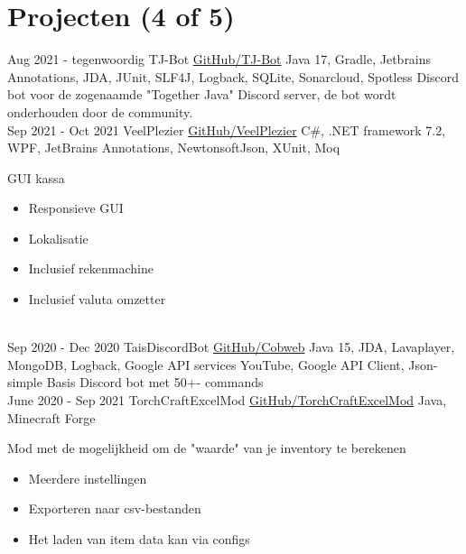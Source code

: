 \documentclass[letterpaper]{twentysecondcv} %
\begin{document}
\section{Projecten (4 of 5)}
\begin{twenty} %
	\twentyitem
    		{Aug 2021 -}
		{tegenwoordig}
        		{TJ-Bot}
        		{\href{https://github.com/Together-Java/TJ-Bot/}{GitHub/TJ-Bot}}
        		{Java 17, Gradle, Jetbrains Annotations, JDA, JUnit, SLF4J, Logback, SQLite, Sonarcloud, Spotless}
        		{Discord bot voor de zogenaamde "Together Java" Discord server, de bot wordt onderhouden door de community.}\\
	\twentyitem
    		{Sep 2021 -}
		{Oct 2021}
        		{VeelPlezier}
        		{\href{https://github.com/Tais993/VeelPlezier}{GitHub/VeelPlezier}}
        		{C\#, .NET framework 7.2, WPF, JetBrains Annotations, NewtonsoftJson, XUnit, Moq}
        		{
        		GUI kassa
        		\begin{itemize}
        			\item Responsieve GUI
        			\item Lokalisatie
        			\item Inclusief rekenmachine
        			\item Inclusief valuta omzetter
        		\end{itemize}}\\
	\twentyitem
    		{Sep 2020 -}
		{Dec 2020}
        		{TaisDiscordBot}
        		{\href{https://github.com/Tais993/taisdiscordbot}{GitHub/Cobweb}}
        		{Java 15, JDA, Lavaplayer, MongoDB, Logback, Google API services YouTube, Google API Client, Json-simple}
        		{Basis Discord bot met 50+- commands}\\
	\twentyitem
    		{June 2020 -}
		{Sep 2021}
        		{TorchCraftExcelMod}
        		{\href{https://github.com/Tais993/TorchCraftExcelMod}{GitHub/TorchCraftExcelMod}}
        		{Java, Minecraft Forge}
        		{
        		Mod met de mogelijkheid om de "waarde" van je inventory te berekenen
        		\begin{itemize}
        			\item Meerdere instellingen
        			\item Exporteren naar csv-bestanden
        			\item Het laden van item data kan via configs
        		\end{itemize}}\\
\end{twenty}
\end{document}
